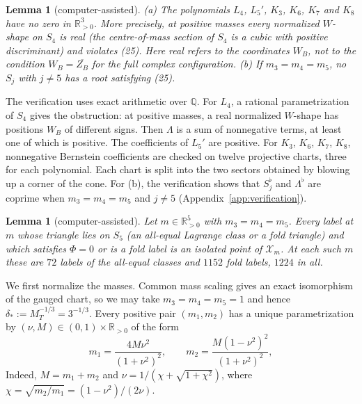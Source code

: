 \documentclass[11pt]{amsart}
\newtheorem{lemma}[theorem]{Lemma}
\theoremstyle{definition}
\theoremstyle{remark}
\newcommand{\Rp}{\mathbb{R}_{>0}}
\begin{document}
\begin{lemma}[computer-assisted]\label{lem:d2-empty}
\textup{(a)} The polynomials $L_4$, $L_5'$, $K_3$, $K_6$, $K_7$ and $K_8$ have no zero in $\Rp^3$.
{More precisely, at positive masses every normalized $W$-shape on $S_4$ is real
\textup{(}the centre-of-mass section of $S_4$ is a cubic with positive discriminant\textup{)}
and violates \textup{(25)}.  Here real refers to the coordinates $W_B$, not to the condition
$W_B=\overline{Z_B}$ for the full complex configuration.}
\textup{(b)} If $m_3=m_4=m_5$, no $S_j$ with $j\ne5$ has a root satisfying \textup{(25)}.
\end{lemma}
{The verification uses exact arithmetic over $\mathbb Q$.
For $L_4$, a rational parametrization of $S_4$ gives the obstruction:
at positive masses, a real normalized $W$-shape has positions $W_B$ of different signs.
Then $\Lambda$ is a sum of nonnegative terms, at least one of which is positive.
The coefficients of $L_5'$ are positive.  For $K_3$, $K_6$, $K_7$, $K_8$, nonnegative
Bernstein coefficients are checked on twelve projective charts, three for each
polynomial.  Each chart is split into the two sectors obtained by blowing up a corner
of the cone.  For (b), the verification shows that $S_j^\flat$ and $\Lambda^\flat$ are
coprime when $m_3=m_4=m_5$ and $j\ne5$ (Appendix~\ref{app:verification}).}

\begin{lemma}[computer-assisted]\label{lem:d2-L5}
Let $m\in\Rp^5$ with $m_3=m_4=m_5$.  Every label at $m$ whose triangle lies on $S_5$ \textup{(}an
all-equal Lagrange class or a fold triangle\textup{)} and which satisfies $\Phi=0$ or is a fold
label is an isolated point of $\mathcal X_m$.  At each such $m$ these are $72$ labels of the all-equal
classes and $1152$ fold labels, $1224$ in all.
\end{lemma}

{We first normalize the masses.  Common mass scaling gives an exact
isomorphism of the gauged chart, so we may take $m_3=m_4=m_5=1$ and hence
$\delta_*:=M_T^{-1/3}=3^{-1/3}$.
Every positive pair $(m_1,m_2)$ has a unique parametrization by
$(\nu,M)\in(0,1)\times\Rp$ of the form}
\[
  m_1=\frac{4M\nu^2}{(1+\nu^2)^2},\qquad m_2=\frac{M(1-\nu^2)^2}{(1+\nu^2)^2},
\]
{Indeed, $M=m_1+m_2$ and $\nu=1/(\chi+\sqrt{1+\chi^2})$, where
$\chi=\sqrt{m_2/m_1}=(1-\nu^2)/(2\nu)$.}
\end{document}
